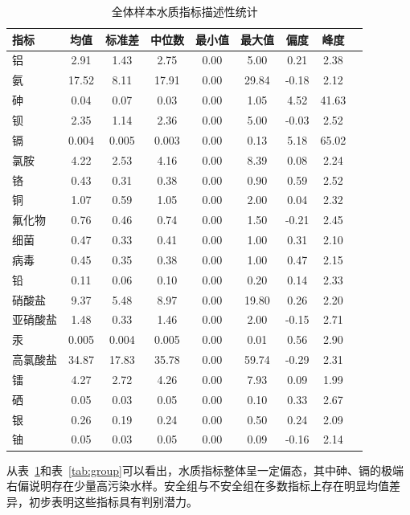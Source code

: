 \documentclass[12pt,a4paper]{ctexart}
\begin{document}
\begin{table}[H]
\centering
\caption{全体样本水质指标描述性统计}
\label{tab:desc}
\begin{tabular}{lcccccccc}
\toprule
指标 & 均值 & 标准差 & 中位数 & 最小值 & 最大值 & 偏度 & 峰度 \\
\midrule
铝 & 2.91 & 1.43 & 2.75 & 0.00 & 5.00 & 0.21 & 2.38 \\
氨 & 17.52 & 8.11 & 17.91 & 0.00 & 29.84 & -0.18 & 2.12 \\
砷 & 0.04 & 0.07 & 0.03 & 0.00 & 1.05 & 4.52 & 41.63 \\
钡 & 2.35 & 1.14 & 2.36 & 0.00 & 5.00 & -0.03 & 2.52 \\
镉 & 0.004 & 0.005 & 0.003 & 0.00 & 0.13 & 5.18 & 65.02 \\
氯胺 & 4.22 & 2.53 & 4.16 & 0.00 & 8.39 & 0.08 & 2.24 \\
铬 & 0.43 & 0.31 & 0.38 & 0.00 & 0.90 & 0.59 & 2.52 \\
铜 & 1.07 & 0.59 & 1.05 & 0.00 & 2.00 & 0.04 & 2.32 \\
氟化物 & 0.76 & 0.46 & 0.74 & 0.00 & 1.50 & -0.21 & 2.45 \\
细菌 & 0.47 & 0.33 & 0.41 & 0.00 & 1.00 & 0.31 & 2.10 \\
病毒 & 0.45 & 0.35 & 0.38 & 0.00 & 1.00 & 0.47 & 2.15 \\
铅 & 0.11 & 0.06 & 0.10 & 0.00 & 0.20 & 0.14 & 2.33 \\
硝酸盐 & 9.37 & 5.48 & 8.97 & 0.00 & 19.80 & 0.26 & 2.20 \\
亚硝酸盐 & 1.48 & 0.33 & 1.46 & 0.00 & 2.00 & -0.15 & 2.71 \\
汞 & 0.005 & 0.004 & 0.005 & 0.00 & 0.01 & 0.56 & 2.90 \\
高氯酸盐 & 34.87 & 17.83 & 35.78 & 0.00 & 59.74 & -0.29 & 2.31 \\
镭 & 4.27 & 2.72 & 4.26 & 0.00 & 7.93 & 0.09 & 1.99 \\
硒 & 0.05 & 0.03 & 0.05 & 0.00 & 0.10 & 0.33 & 2.67 \\
银 & 0.26 & 0.19 & 0.24 & 0.00 & 0.50 & 0.24 & 2.09 \\
铀 & 0.05 & 0.03 & 0.05 & 0.00 & 0.09 & -0.16 & 2.14 \\
\bottomrule
\end{tabular}
\end{table}

从表~\ref{tab:desc}和表~\ref{tab:group}可以看出，水质指标整体呈一定偏态，其中砷、镉的极端右偏说明存在少量高污染水样。安全组与不安全组在多数指标上存在明显均值差异，初步表明这些指标具有判别潜力。
\end{document}
